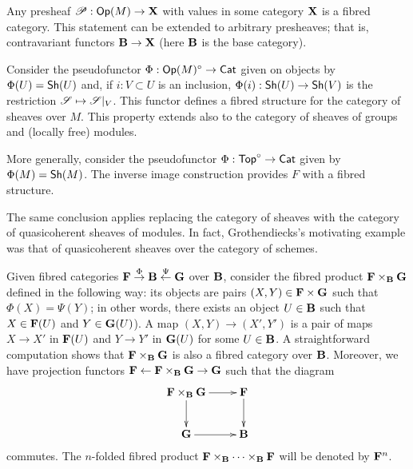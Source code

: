 \begin{ej}\label{fcex_4}
Any presheaf $\mathscr{P}:\mathsf{Op}(M)\to {\bf X}$ with values in some category ${\bf X}$ is a fibred category. This statement can be extended to arbitrary presheaves; that is, contravariant functors ${\bf B}\to {\bf X}$ (here ${\bf B}$ is the base category). 
\end{ej}

\begin{ej}\label{fcex_5}
Consider the pseudofunctor $\Phi :\mathsf{Op}(M)^\circ \to \mathsf{Cat}$ given on objects by $\Phi (U)=\mathsf{Sh}(U)$ and, if $i:V\subset U$ is an inclusion, $\Phi (i):\mathsf{Sh}(U)\to \mathsf{Sh}(V)$ is the restriction $\mathscr{S}\mapsto \mathscr{S}|_V$. This functor defines a fibred structure for the category of sheaves over $M$. This property extends also to the category of sheaves of groups and (locally free) modules.

More generally, consider the pseudofunctor $\Phi :\mathsf{Top}^\circ \to \mathsf{Cat}$ given by $\Phi (M)=\mathsf{Sh}(M)$. The inverse image construction provides $F$ with a fibred structure.

The same conclusion applies replacing the category of sheaves with the category of quasicoherent sheaves of modules. In fact, Grothendiecks's motivating example was that of quasicoherent sheaves over the category of schemes.
\end{ej}

\begin{ej}\label{fcex_7}
Given fibred categories ${\bf F}\stackrel{\Phi}{\rightarrow}{\bf B}\stackrel{\Psi}{\leftarrow}{\bf G}$ over ${\bf B}$, consider the fibred product ${\bf F}\times_{{\bf B}}{\bf G}$ defined in the following way: its objects are pairs $(X,Y)\in {\bf F}\times {\bf G}$ such that $\Phi (X)=\Psi (Y)$; in other words, there exists an object $U\in {\bf B}$ such that $X\in {\bf F}(U)$ and $Y\in {\bf G}(U)$). A map $(X,Y)\to (X',Y')$ is a pair of maps $X\to X'$ in ${\bf F}(U)$ and $Y\to Y'$ in ${\bf G}(U)$ for some $U\in {\bf B}$. A straightforward computation shows that ${\bf F}\times_{{\bf B}}{\bf G}$ is also a fibred category over ${\bf B}$. Moreover, we have projection functors ${\bf F}\leftarrow {\bf F}\times_{{\bf B}}{\bf G}\rightarrow {\bf G}$ such that the diagram
$$
\xymatrix{
{\bf F}\times_{{\bf B}}{\bf G} \ar[r] \ar[d] & {\bf F} \ar[d] \\
{\bf G} \ar[r] & {\bf B}}
$$
commutes. The $n$-folded fibred product ${\bf F}\times_{\bf B}\cdots \times_{\bf B}{\bf F}$ will be denoted by ${\bf F}^n$.
\end{ej}

